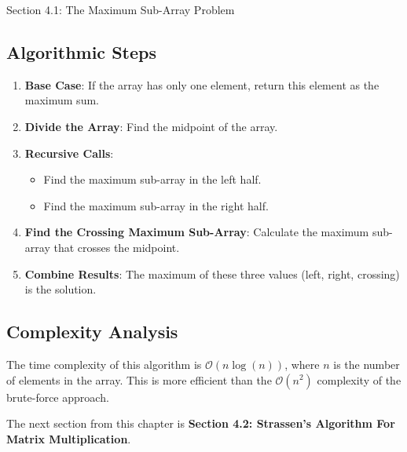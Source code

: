 \begin{notes}{Section 4.1: The Maximum Sub-Array Problem}
    \subsection*{Algorithmic Steps}

    \begin{enumerate}
        \item \textbf{Base Case}: If the array has only one element, return this element as the maximum sum.
        \item \textbf{Divide the Array}: Find the midpoint of the array.
        \item \textbf{Recursive Calls}:
        \begin{itemize}
            \item Find the maximum sub-array in the left half.
            \item Find the maximum sub-array in the right half.
        \end{itemize}
        \item \textbf{Find the Crossing Maximum Sub-Array}: Calculate the maximum sub-array that crosses the midpoint.
        \item \textbf{Combine Results}: The maximum of these three values (left, right, crossing) is the solution.
    \end{enumerate}

    \subsection*{Complexity Analysis}

    The time complexity of this algorithm is $\mathcal{O}(n\log{(n)})$, where $n$ is the number of elements in the array. This is more efficient than the $\mathcal{O}(n^{2})$ complexity of the 
    brute-force approach.
\end{notes}

The next section from this chapter is \textbf{Section 4.2: Strassen's Algorithm For Matrix Multiplication}.

